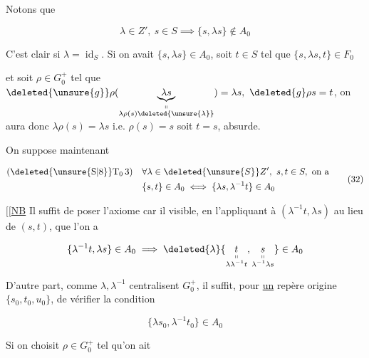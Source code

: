 
Notons que

\[
\lambda\in Z',\ s\in S\implies\{s,\lambda s\}\notin A_0\tag*{(31)}
\]

C'est clair si $\lambda=\operatorname{id}_S$. Si on avait $\{s,\lambda s\}\in A_0$, soit $t\in S$ tel que $\{s,\lambda s,t\}\in F_0$


et soit $\rho\in G_0^+$ tel que $\deleted{\unsure{g}}\rho(\underbrace{\lambda s}_{\substack{\shortparallel\\\lambda\rho(s)\deleted{\unsure{\lambda}}}})=\lambda s,\ \deleted{g}\rho s=t$, on aura donc $\lambda\rho(s)=\lambda s$ i.e. $\rho(s)=s$ soit $t=s$, absurde.

On suppose maintenant

\[
\begin{aligned}
 (\deleted{\unsure{\mathrm S|8}}\mathrm T_0\,3)\quad&\forall\lambda\in\deleted{\unsure{S}}Z',\ s,t\in S,\ \text{on a}\\
 &\{s,t\}\in A_0\iff\{\lambda s,\lambda^{-1}t\}\in A_0
\end{aligned}\tag*{(32)}
\]

$\bigl[\!\bigl[$\uline{NB} Il suffit de poser  l'axiome \inserted{$\Longrightarrow$} car il  visible, en l'appliquant à $(\lambda^{-1}t,\lambda s)$ au lieu de $(s,t)$, que l'on a

\[
\{\lambda^{-1}t,\lambda s\}\in A_0\implies\deleted{\lambda}\{\underset{\substack{\shortparallel\\\lambda\lambda^{-1}t}}{t},\underset{\substack{\shortparallel\\\lambda^{-1}\lambda s}}{s}\}\in A_0
\]

D'autre part, comme $\lambda,\lambda^{-1}$ centralisent $G_0^+$, il suffit, pour \uline{un} repère origine $\{s_0,t_0,u_0\}$, de vérifier la condition

\[
\{\lambda s_0,\lambda^{-1}t_0\}\in A_0\tag*{(32 bis)}
\]

Si on  choisit $\rho\in G_0^+$ tel qu'on ait
